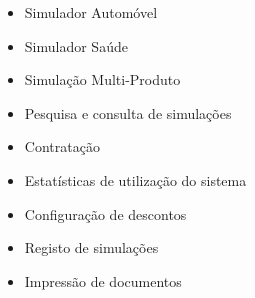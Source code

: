 \begin{itemize}
\item Simulador Automóvel
\item Simulador Saúde
\item Simulação Multi-Produto
\item Pesquisa e consulta de simulações
\item Contratação
\item Estatísticas de utilização do sistema
\item Configuração de descontos
\item Registo de simulações
\item Impressão de documentos
\end{itemize}
